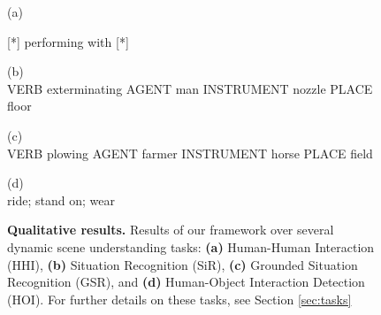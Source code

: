 


\begin{figure*}
  {\vspace{-5pt}\begin{center} \small{(a) 
  
  [*] performing with [*]} \end{center}}
  \hfill
  {\vspace{-5pt}\begin{center} \small{(b)\\ VERB exterminating AGENT man INSTRUMENT nozzle PLACE floor} \end{center}}
  \hfill
  {\vspace{-5pt}\begin{center} \small{(c)
\\ VERB plowing AGENT farmer INSTRUMENT horse PLACE field} \end{center}}
  \hfill
  {\vspace{-5pt}\begin{center} \small{(d)\\ride; stand on; wear} \end{center}}
  
  \caption{\textbf{Qualitative results.} 
  Results of our framework over several dynamic scene understanding tasks: \textbf{(a)} Human-Human Interaction (HHI), \textbf{(b)} Situation Recognition (SiR), \textbf{(c)} Grounded Situation Recognition (GSR), and \textbf{(d)} Human-Object Interaction Detection (HOI). For further details on these tasks, see Section \ref{sec:tasks}}   %
\label{fig:all_tasks_result}
\end{figure*}
